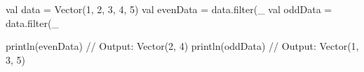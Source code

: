 val data = Vector(1, 2, 3, 4, 5)
val evenData = data.filter(_ %
val oddData = data.filter(_ %

println(evenData) // Output: Vector(2, 4)
println(oddData)  // Output: Vector(1, 3, 5)